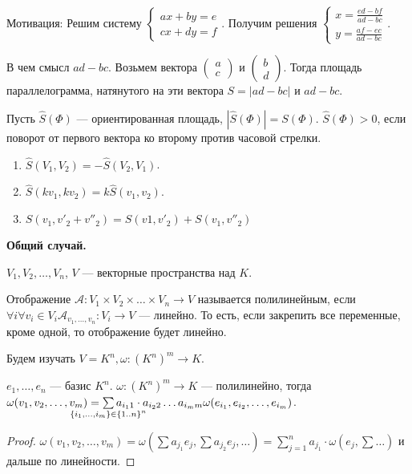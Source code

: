 Мотивация: Решим систему $\begin{cases} ax+by=e \\ cx+dy=f \end{cases}$. Получим решения  $\begin{cases} x = \frac{ed - bf}{ad - bc} \\ y = \frac{af - ec}{ad - bc} \end{cases}$. 

В чем смысл $ad - bc$. Возьмем вектора  $\begin{pmatrix} a \\ c \end{pmatrix}$ и $\begin{pmatrix} b \\ d \end{pmatrix}$. Тогда площадь параллелограмма, натянутого на эти вектора $S = |ad-bc|$ и $ad - bc$.

Пусть $\widehat{S}(\Phi)$ --- ориентированная площадь,  $|\widehat{S}(\Phi)| = S(\Phi)$.  $\widehat{S}(\Phi) > 0$, если поворот от первого вектора ко второму против часовой стрелки.

\begin{properties}
    \begin{enumerate}
        \item $\widehat{S}(V_1, V_2) = -\widehat{S}(V_2, V_1)$.
        \item $\widehat{S}(kv_1, kv_2) = k \widehat{S}(v_1, v_2)$.
        \item $S(v_1, v'_2 + v''_2) = S(v1, v'_2) + S(v_1, v''_2)$
    \end{enumerate}
\end{properties}

\textbf{\huge Общий случай.}

\begin{definition}
    $V_1, V_2, \ldots, V_n$, $V$ ---  векторные пространства над $K$.

    Отображение  $\mathcal{A}\!: V_1 \times V_2 \times \ldots \times V_n \to V$ называется полилинейным, если $\forall i \forall v_i \in V_i \mathcal{A}_{v_1, \ldots, v_n}\!: V_i \to V$ --- линейно. То есть, если закрепить все переменные, кроме одной, то отображение будет линейно.
\end{definition}

Будем изучать $V = K^n, \omega\!: (K^n)^m \to K$.
 \begin{lemma}
    $e_1, \ldots, e_n$ --- базис $K^n$.  $\omega\!: (K^n)^m \to K$ --- полилинейно, тогда $\omega(v_1, v_2, \ldots, v_m) = \sum\limits_{\mathclap{\{i_1, \ldots, i_m\} \in \{1..n\}^n}} a_{i_1 1}\cdot a_{i_2 2}\ldots a_{i_m m} \omega(e_{i_1}, e_{i_2},\ldots, e_{i_m})$.
\end{lemma}
\begin{proof}
    $\omega(v_1, v_2, \ldots, v_m) = \omega(\sum a_{j_1} e_j, \sum a_{j_2} e_j, \ldots) = \sum\limits_{j=1}^n a_{j_1} \cdot \omega(e_j, \sum \ldots)$ и дальше по линейности.
\end{proof}

